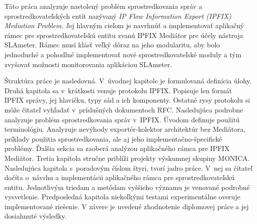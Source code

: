 Táto práca analyzuje nastolený problém sprostredkovania správ a sprostredkovateľských entít nazývaný 
\emph{IP Flow Information Export (IPFIX) Mediation Problem}. Jej hlavným cieľom je navrhnúť a implementovať
aplikačný rámec pre sprostredkovateľskú entitu zvanú IPFIX Mediátor pre účely nástroja SLAmeter. 
Rámec musí klásť veľký dôraz na jeho modularitu, aby bolo jednoduché a pohodlné implementovať nové 
sprostredkovateľské moduly a tým zvyšovať možnosti monitorovania aplikáciou SLAmeter.

Štruktúra práce je nasledovná. V~úvodnej kapitole je formulovaná definícia úlohy. Druhá kapitola sa 
v~krátkosti venuje protokolu IPFIX. Popisuje len formát IPFIX správy, jej hlavičku, typy
sád a ich komponenty. Ostatné rysy protokolu si môže čitateľ vyhľadať v~príslušných dokumentoch RFC.
Nasledujúca podrobne analyzuje problém sprostredkovania správ v~IPFIX. Úvodom definuje použitú 
terminológiu. Analyzuje nevýhody exportér-kolektor architektúr bez Mediátora, príklady použitia 
sprostredkovania, ale aj jeho implementačno-špecifické problémy. Ďalšia sekcia sa zaoberá analýzou 
aplikačného rámca pre IPFIX Mediátor. Tretia kapitola stručne priblíži projekty výskumnej skupiny MONICA.
Nasledujúca kapitola s~poradovým číslom štyri, tvorí jadro práce. V~nej sa čitateľ dočíta o~návrhu a 
implementácii aplikačného rámca pre sprostredkovateľskú entitu. Jednotlivým triedam a metódam vyššieho 
významu je venované podrobné vysvetlenie. Predposledná kapitola niekoľkými testami experimentálne 
overuje implementované riešenie. V závere je uvedené zhodnotenie diplomovej práce a jej dosiahnuté 
výsledky. 
